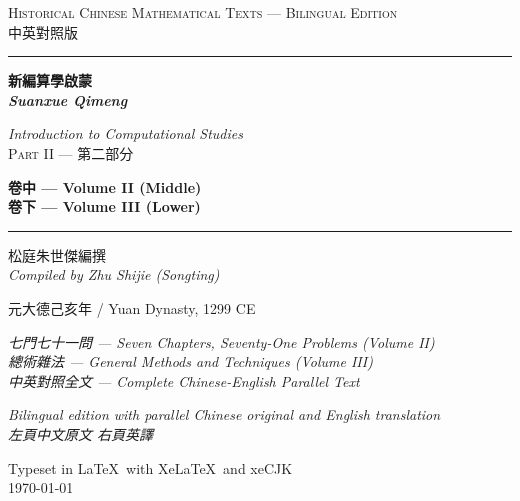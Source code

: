 \documentclass[11pt,a4paper]{article}
\providecommand{\XeLaTeX}{XeLaTeX}
\newcommand{\longline}{\noindent\rule{\textwidth}{0.4pt}}
\begin{document}
\begin{titlepage}
\centering
\vspace*{2cm}

{\fontsize{14}{16}\selectfont\textsc{Historical Chinese Mathematical Texts --- Bilingual Edition}}\\[0.3cm]
{\fontsize{12}{14}\selectfont\textsc{中英對照版}}
\vspace{0.8cm}

\longline
\vspace{1.5cm}

{\fontsize{28}{34}\selectfont\bfseries\color{titlecolor}
新編算學啟蒙\\[0.5cm]
\textit{Suanxue Qimeng}\\[0.3cm]
}
\vspace{0.5cm}

{\fontsize{16}{20}\selectfont\color{sectioncolor}
\textit{Introduction to Computational Studies}\\[0.3cm]
\textsc{Part II --- 第二部分}\\[0.8cm]
}

\vspace{0.3cm}

{\fontsize{14}{18}\selectfont\bfseries\color{chaptercolor}
卷中 --- Volume II (Middle)\\[0.3cm]
卷下 --- Volume III (Lower)\\[0.3cm]
}

\vspace{1.5cm}
\longline
\vspace{1cm}

{\large 松庭朱世傑編撰\\[0.2cm]
\textit{Compiled by Zhu Shijie (Songting)}\\[0.5cm]
}

\vspace{0.5cm}

{\large 元大德己亥年 / Yuan Dynasty, 1299 CE\\[0.3cm]
}

\vspace{1cm}

\begin{minipage}{0.85\textwidth}
\centering
\textit{七門七十一問 --- Seven Chapters, Seventy-One Problems (Volume II)}\\[0.3cm]
\textit{總術雜法 --- General Methods and Techniques (Volume III)}\\[0.3cm]
\textit{中英對照全文 --- Complete Chinese-English Parallel Text}
\end{minipage}

\vfill

{\small\textit{Bilingual edition with parallel Chinese original and English translation}\\[0.3cm]
\textit{左頁中文原文 \quad 右頁英譯}\\[0.5cm]
}

{\small Typeset in \LaTeX\ with \XeLaTeX\ and xeCJK\\
\today}

\end{titlepage}
\end{document}
